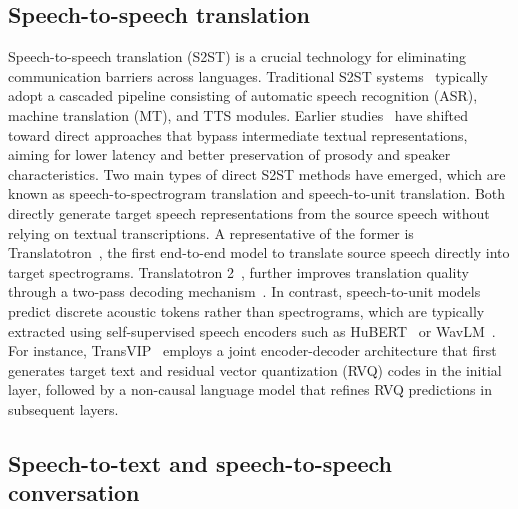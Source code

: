 \subsection{Speech-to-speech translation}
Speech-to-speech translation (S2ST) is a crucial technology for eliminating communication barriers across languages. Traditional S2ST systems~\cite{wahlster2013verbmobil,wu2016google} typically adopt a cascaded pipeline consisting of automatic speech recognition (ASR), machine translation (MT), and TTS modules. Earlier studies~\cite{jia2019direct,jia2022translatotron,le2024transvip,lee2021textless} have shifted toward direct approaches that bypass intermediate textual representations, aiming for lower latency and better preservation of prosody and speaker characteristics. Two main types of direct S2ST methods have emerged, which are known as speech-to-spectrogram translation and speech-to-unit translation. Both directly generate target speech representations from the source speech without relying on textual transcriptions. A representative of the former is Translatotron~\cite{jia2019direct}, the first end-to-end model to translate source speech directly into target spectrograms. Translatotron 2~\cite{jia2022translatotron}, further improves translation quality through a two-pass decoding mechanism~\cite{lee2021textless}. In contrast, speech-to-unit models predict discrete acoustic tokens rather than spectrograms, which are typically extracted using self-supervised speech encoders such as HuBERT~\cite{HuBERT} or WavLM~\cite{WavLM}. For instance, TransVIP~\cite{le2024transvip} employs a joint encoder-decoder architecture that first generates target text and residual vector quantization (RVQ) codes in the initial layer, followed by a non-causal language model that refines RVQ predictions in subsequent layers.


\subsection{Speech-to-text and speech-to-speech conversation}


